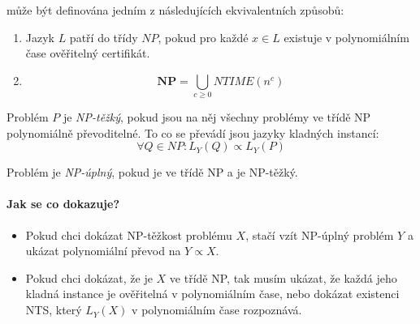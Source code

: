 \documentclass[a4paper]{article}      %
\newenvironment{definition}[1][Definice]{\begin{trivlist}
\item[\hskip \labelsep {\bfseries #1}]}{\end{trivlist}}
\begin{document}
\begin{definition}[Třída NP] může být definována jedním z následujících ekvivalentních způsobů:
\begin{enumerate}
\item Jazyk $L$ patří do třídy $NP$, pokud pro každé $x \in L$ existuje v polynomiálním čase ověřitelný certifikát.
\item
\[
\mathbf{NP} = \bigcup_{c \geq 0} NTIME(n^{c})
\]
\end{enumerate}
\end{definition}

\begin{definition}[NP-těžkost]
Problém $P$ je \emph{NP-těžký}, pokud jsou na něj všechny problémy ve třídě NP polynomiálně převoditelné.
To co se převádí jsou jazyky kladných instancí:
\[
\forall Q \in NP: L_{Y}(Q) \varpropto L_{Y}(P)
\] 
\end{definition}

\begin{definition}[NP-úplnost]
Problém je \emph{NP-úplný}, pokud je ve třídě NP a je NP-těžký.
\end{definition}

\paragraph{Jak se co dokazuje?}
\begin{itemize}
\item Pokud chci dokázat NP-těžkost problému $X$, stačí vzít NP-úplný problém $Y$ a ukázat polynomiální převod na $Y \varpropto X$.
\item Pokud chci dokázat, že je $X$ ve třídě NP, tak musím ukázat, že každá jeho kladná instance je ověřitelná v polynomiálním čase, nebo dokázat existenci NTS, který $L_{Y}(X)$ v polynomiálním čase rozpoznává.
\end{itemize}
\end{document}
